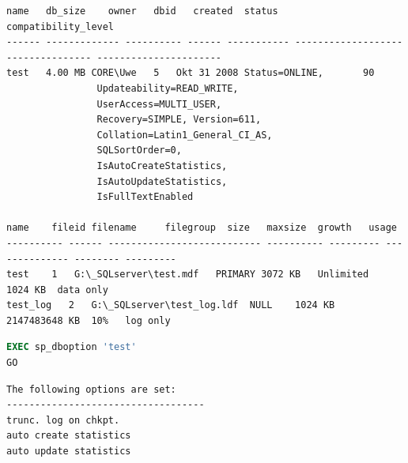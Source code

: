 \documentclass[12pt,ngerman,a4paper,index=totoc,twoside]{scrartcl}
\newcommand{\lwidth}{0.75}
\begin{document}
\begin{center}
\begin{minipage}{0.8\textwidth}
\begin{lstlisting}[caption={Ergebnis von Listing \ref{create1:sphelpdb1}},basicstyle={\ttfamily\tiny},label={create1:sphelpdb1a}]
name   db_size    owner   dbid   created  status          compatibility_level
------ ------------- ---------- ------ ----------- ---------------------------------- ----------------------
test   4.00 MB CORE\Uwe   5   Okt 31 2008 Status=ONLINE,       90
                Updateability=READ_WRITE, 
                UserAccess=MULTI_USER, 
                Recovery=SIMPLE, Version=611, 
                Collation=Latin1_General_CI_AS,
                SQLSortOrder=0, 
                IsAutoCreateStatistics, 
                IsAutoUpdateStatistics, 
                IsFullTextEnabled 

name    fileid filename     filegroup  size   maxsize  growth   usage
---------- ------ --------------------------- ---------- --------- -------------- -------- ---------
test    1   G:\_SQLserver\test.mdf   PRIMARY 3072 KB   Unlimited   1024 KB  data only
test_log   2   G:\_SQLserver\test_log.ldf  NULL    1024 KB   2147483648 KB  10%   log only
\end{lstlisting}
\end{minipage}
\end{center}


\begin{center}
\begin{minipage}{\lwidth\textwidth}
\begin{lstlisting}[language={SQL},caption={Informationen zur Datenbank 'name' abfragen},label={create1:sphelpdb2}]
EXEC sp_dboption 'test'
GO
\end{lstlisting}
\end{minipage}
\end{center}


\begin{center}
\begin{minipage}{0.8\textwidth}
\begin{lstlisting}[caption={Ergebnis von Listing \ref{create1:sphelpdb2}},basicstyle={\ttfamily\small},label={create1:sphelpdb2a}]
The following options are set:
-----------------------------------
trunc. log on chkpt.
auto create statistics
auto update statistics
\end{lstlisting}
\end{minipage}
\end{center}
\end{document}
